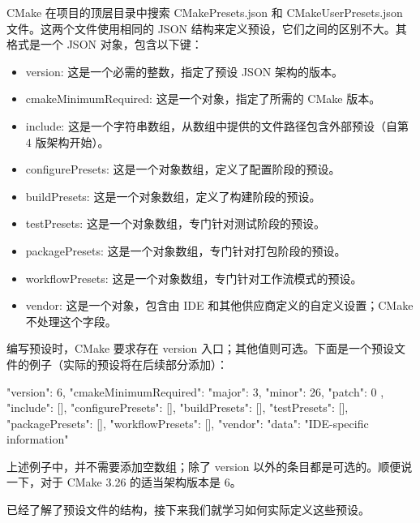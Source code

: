 CMake 在项目的顶层目录中搜索 CMakePresets.json 和 CMakeUserPresets.json 文件。这两个文件使用相同的 JSON 结构来定义预设，它们之间的区别不大。其格式是一个 JSON 对象，包含以下键：

\begin{itemize}
\item
version:  这是一个必需的整数，指定了预设 JSON 架构的版本。

\item
cmakeMinimumRequired: 这是一个对象，指定了所需的 CMake 版本。

\item
include: 这是一个字符串数组，从数组中提供的文件路径包含外部预设（自第 4 版架构开始）。

\item
configurePresets: 这是一个对象数组，定义了配置阶段的预设。

\item
buildPresets: 这是一个对象数组，定义了构建阶段的预设。

\item
testPresets: 这是一个对象数组，专门针对测试阶段的预设。

\item
packagePresets: 这是一个对象数组，专门针对打包阶段的预设。

\item
workflowPresets: 这是一个对象数组，专门针对工作流模式的预设。

\item
vendor: 这是一个对象，包含由 IDE 和其他供应商定义的自定义设置；CMake 不处理这个字段。
\end{itemize}

编写预设时，CMake 要求存在 version 入口；其他值则可选。下面是一个预设文件的例子（实际的预设将在后续部分添加）：


\begin{json}
{
    "version": 6,
    "cmakeMinimumRequired": {
        "major": 3,
        "minor": 26,
        "patch": 0
    },
    "include": [],
    "configurePresets": [],
    "buildPresets": [],
    "testPresets": [],
    "packagePresets": [],
    "workflowPresets": [],
    "vendor": {
        "data": "IDE-specific information"
    }
}
\end{json}

上述例子中，并不需要添加空数组；除了 version 以外的条目都是可选的。顺便说一下，对于 CMake 3.26 的适当架构版本是 6。

已经了解了预设文件的结构，接下来我们就学习如何实际定义这些预设。
